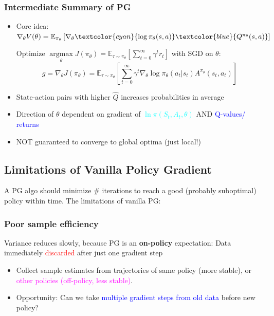 \documentclass{article}
\begin{document}
\begin{defbox}
    \subsubsection*{Intermediate Summary of PG}
    \begin{itemize}
    \item Core idea: $\nabla_{\theta} V(\theta) = \mathbb{E}_{\pi_{\theta}} \left[ \nabla_{\theta} \textcolor{cyan}{\log \pi_{\theta} (s, a)} \textcolor{blue}{Q^{\pi_{\theta}} (s, a)} \right]$
        \\\begin{prfbox}
            Optimize $\mathop{\arg\max}\limits_{\theta} J(\pi_{\theta}) = \mathbb{E}_{\tau \sim \pi_{\theta}} \left[ \sum_{t = 0}^{\infty} \gamma^{t} r_{t}\right]$ with SGD on $\theta$:
            \begin{equation*}
                g = \nabla_{\theta} J(\pi_{\theta}) = \mathbb{E}_{\tau \sim \pi_{\theta}} \left[ \sum_{t = 0}^{\infty} \gamma^{t} \nabla_{\theta} \log \pi_{\theta} (a_t | s_t) A^{\pi_{\theta}} (s_t, a_t) \right]
            \end{equation*}
        \end{prfbox}
    \item State-action pairs with higher $\hat{Q}$ increases probabilities in average
    \item Direction of $\theta$ dependent on gradient of \textcolor{cyan}{$\ln \pi(S_t, A_t, \theta)$} AND \textcolor{blue}{Q-values/ returns}
    \item NOT guaranteed to converge to global optima (just local!)
    \end{itemize}
\end{defbox}

\subsection{Limitations of Vanilla Policy Gradient}
    A PG algo should minimize \# iterations to reach a good (probably suboptimal) policy within time. The limitations of vanilla PG:
    \subsubsection{Poor sample efficiency}
    Variance reduces slowly, because PG is an \textbf{on-policy} expectation: Data immediately \textcolor{red}{discarded} after just one gradient step
    \begin{itemize}
    \item Collect sample estimates from trajectories of same policy (more stable), or \textcolor{magenta}{other policies (off-policy, less stable)}.
    \item Opportunity: Can we take \textcolor{blue}{multiple gradient steps from old data} before new policy?
    \end{itemize}
\end{document}
